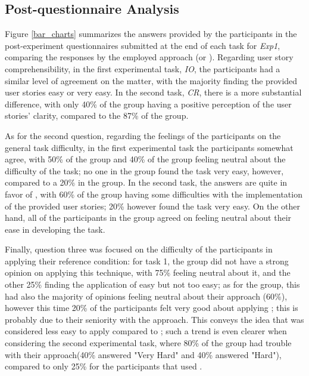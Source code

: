\subsection{Post-questionnaire Analysis}
Figure \ref{bar_charts} summarizes the answers provided by the participants in the post-experiment questionnaires submitted at the end of each task for \textit{Exp1}, comparing the responses by the employed approach (\tdd or \notdd).
Regarding user story comprehensibility, in the first experimental task, \textit{IO}, the participants had a similar level of agreement on the matter, with the majority finding the provided user stories easy or very easy. In the second task, \textit{CR}, there is a more substantial difference, with only 40\% of the \tdd group having a positive perception of the user stories' clarity, compared to the 87\% of the \notdd group.

As for the second question, regarding the feelings of the participants on the general task difficulty, in the first experimental task the participants somewhat agree, with 50\% of the \tdd group and 40\% of the \notdd group feeling neutral about the difficulty of the task; no one in the \tdd group found the task very easy, however, compared to a 20\% in the \notdd group. In the second task, the answers are quite in favor of \notdd, with 60\% of the \tdd group having some difficulties with the implementation of the provided user stories; 20\% however found the task very easy. On the other hand, all of the participants in the \notdd group agreed on feeling neutral about their ease in developing the task.

Finally, question three was focused on the difficulty of the participants in applying their reference condition: for task 1, the \tdd group did not have a strong opinion on applying this technique, with 75\% feeling neutral about it, and the other 25\% finding the application of \tdd easy but not too easy; as for the \notdd group, this had also the majority of opinions feeling neutral about their approach (60\%), however this time 20\% of the participants felt very good about applying \notdd; this is probably due to their seniority with the approach. This conveys the idea that \tdd was considered less easy to apply compared to \notdd; such a trend is even clearer when considering the second experimental task, where 80\% of the \tdd group had trouble with their approach(40\% answered "Very Hard" and 40\% answered "Hard"), compared to only 25\% for the participants that used \notdd.


